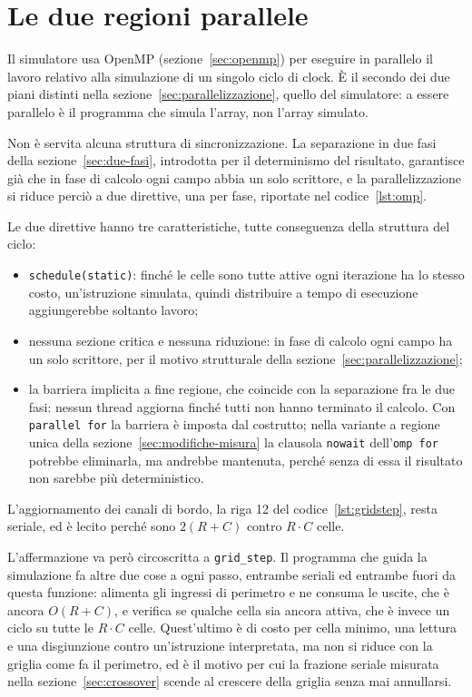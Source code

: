 \section{Le due regioni parallele}
\label{sec:omp-impl}

Il simulatore usa OpenMP (sezione~\ref{sec:openmp}) per eseguire in parallelo
il lavoro relativo alla simulazione di un singolo ciclo di clock. È il secondo dei due piani distinti nella
sezione~\ref{sec:parallelizzazione}, quello del simulatore: a essere parallelo è
il programma che simula l'array, non l'array simulato.

Non è servita alcuna struttura di sincronizzazione. La separazione in due fasi
della sezione~\ref{sec:due-fasi}, introdotta per il determinismo del risultato,
garantisce già che in fase di calcolo ogni campo abbia un solo scrittore, e la
parallelizzazione si riduce perciò a due direttive, una per fase, riportate nel
codice~\ref{lst:omp}.

Le due direttive hanno tre caratteristiche, tutte conseguenza della struttura del ciclo:

\begin{itemize}
    \item \texttt{schedule(static)}: finché le celle sono tutte attive ogni iterazione
          ha lo stesso costo, un'istruzione
           simulata, quindi distribuire a tempo di esecuzione
          aggiungerebbe soltanto lavoro;
    \item nessuna sezione critica e nessuna riduzione: in fase di calcolo ogni
          campo ha un solo scrittore, per il motivo strutturale della
          sezione~\ref{sec:parallelizzazione};
    \item la barriera implicita a fine regione, che coincide con la separazione
          fra le due fasi: nessun thread aggiorna finché tutti non hanno
          terminato il calcolo. Con \texttt{parallel for} la barriera è imposta
          dal costrutto; nella variante a regione unica della
          sezione~\ref{sec:modifiche-misura} la clausola \texttt{nowait}
          dell'\texttt{omp for} potrebbe eliminarla, ma andrebbe mantenuta,
          perché senza di essa il risultato non sarebbe più deterministico.
\end{itemize}

L'aggiornamento dei canali di bordo, la riga 12 del codice~\ref{lst:gridstep},
resta seriale, ed è lecito perché sono $2(R+C)$ contro $R \cdot C$ celle.

L'affermazione va però circoscritta a \texttt{grid\_step}. Il programma che
guida la simulazione fa altre due cose a ogni passo, entrambe seriali ed
entrambe fuori da questa funzione: alimenta gli ingressi di perimetro e ne
consuma le uscite, che è ancora
$O(R+C)$, e verifica se qualche cella sia ancora attiva, che è invece un ciclo su
tutte le $R \cdot C$ celle. Quest'ultimo è di costo per cella minimo, una
lettura e una disgiunzione contro un'istruzione interpretata, ma non si
riduce con la griglia come fa il perimetro, ed è il motivo per cui la frazione
seriale misurata nella sezione~\ref{sec:crossover} scende al crescere della
griglia senza mai annullarsi.

